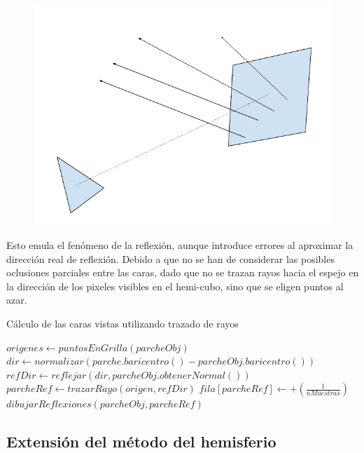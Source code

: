 \begin{figure}[htbp!]
	\centering
	\includegraphics[width=.8\linewidth]{assets/nose}
	\label{img:hibrido}
\end{figure}

Esto emula el fenómeno de la reflexión, aunque introduce errores al aproximar la dirección real de reflexión. Debido a que no se han de considerar las posibles oclusiones parciales entre las caras, dado que no se trazan rayos hacia el espejo en la dirección de los pixeles visibles en el hemi-cubo, sino que se eligen puntos al azar.

\begin{algorithm}
	\caption{Cálculo de las caras vistas utilizando trazado de rayos}
	\label{alg:reflections}
	\fontsize{8}{8}\selectfont
	\begin{algorithmic}
			\State $origenes \gets puntosEnGrilla(parcheObj)$
				\State $dir \gets normalizar(parche.baricentro() - parcheObj.baricentro())$
				\State $refDir \gets reflejar(dir, parcheObj.obtenerNormal())$
				\State $parcheRef \gets trazarRayo(origen, refDir)$
				\State $fila[parcheRef] \gets +(\frac{1}{nMuestras})$
						\State $dibujarReflexiones(parcheObj, parcheRef)$
					\EndIf
				\EndIf
			\EndLoop
		\EndFunction
	\end{algorithmic}
\end{algorithm}

\subsection{Extensión del método del hemisferio}

